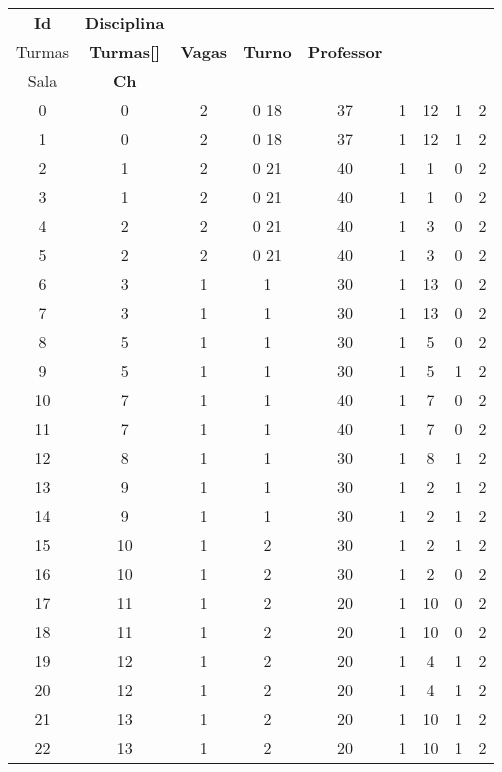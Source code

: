 \begin{apendices}
{\footnotesize
\begin{longtable}{|c|c|c|c|c|c|c|c|c|}
\hline
\textbf{Id} & \textbf{Disciplina} & \textbf{\begin{tabular}[c]{@{}c@{}}Nº de\\ Turmas\end{tabular}} & \textbf{Turmas{[}{]}} & \textbf{Vagas} & \textbf{Turno} & \textbf{Professor} & \textbf{\begin{tabular}[c]{@{}c@{}}Tipo de\\ Sala\end{tabular}} & \textbf{Ch} \\ \hline
0 & 0 & 2 & 0 18 & 37 & 1 & 12 & 1 & 2 \\ \hline
1 & 0 & 2 & 0 18 & 37 & 1 & 12 & 1 & 2 \\ \hline
2 & 1 & 2 & 0 21 & 40 & 1 & 1 & 0 & 2 \\ \hline
3 & 1 & 2 & 0 21 & 40 & 1 & 1 & 0 & 2 \\ \hline
4 & 2 & 2 & 0 21 & 40 & 1 & 3 & 0 & 2 \\ \hline
5 & 2 & 2 & 0 21 & 40 & 1 & 3 & 0 & 2 \\ \hline
6 & 3 & 1 & 1 & 30 & 1 & 13 & 0 & 2 \\ \hline
7 & 3 & 1 & 1 & 30 & 1 & 13 & 0 & 2 \\ \hline
8 & 5 & 1 & 1 & 30 & 1 & 5 & 0 & 2 \\ \hline
9 & 5 & 1 & 1 & 30 & 1 & 5 & 1 & 2 \\ \hline
10 & 7 & 1 & 1 & 40 & 1 & 7 & 0 & 2 \\ \hline
11 & 7 & 1 & 1 & 40 & 1 & 7 & 0 & 2 \\ \hline
12 & 8 & 1 & 1 & 30 & 1 & 8 & 1 & 2 \\ \hline
13 & 9 & 1 & 1 & 30 & 1 & 2 & 1 & 2 \\ \hline
14 & 9 & 1 & 1 & 30 & 1 & 2 & 1 & 2 \\ \hline
15 & 10 & 1 & 2 & 30 & 1 & 2 & 1 & 2 \\ \hline
16 & 10 & 1 & 2 & 30 & 1 & 2 & 0 & 2 \\ \hline
17 & 11 & 1 & 2 & 20 & 1 & 10 & 0 & 2 \\ \hline
18 & 11 & 1 & 2 & 20 & 1 & 10 & 0 & 2 \\ \hline
19 & 12 & 1 & 2 & 20 & 1 & 4 & 1 & 2 \\ \hline
20 & 12 & 1 & 2 & 20 & 1 & 4 & 1 & 2 \\ \hline
21 & 13 & 1 & 2 & 20 & 1 & 10 & 1 & 2 \\ \hline
22 & 13 & 1 & 2 & 20 & 1 & 10 & 1 & 2 \\ \hline

\end{longtable}}
\end{apendices}
